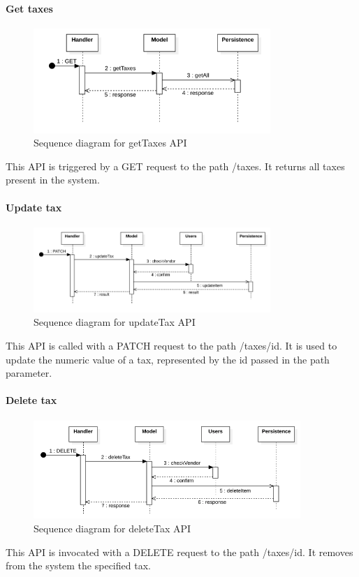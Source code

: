 \paragraph*{Get taxes}
\begin{figure}[H]
    \includegraphics[width=0.8\textwidth]{res/images/sequence-diagrams/taxes/getTaxes.png}
    \caption{Sequence diagram for getTaxes API}
\end{figure}
This API is triggered by a GET request to the path /taxes. It returns all taxes present in the system.

\paragraph*{Update tax}
\begin{figure}[H]
    \includegraphics[width=0.8\textwidth]{res/images/sequence-diagrams/taxes/updateTax.png}
    \caption{Sequence diagram for updateTax API}
\end{figure}
This API is called with a PATCH request to the path /taxes/{id}. It is used to update the numeric value of a tax, represented by the id passed in the path parameter.

\paragraph*{Delete tax}
\begin{figure}[H]
    \includegraphics[width=0.9\textwidth]{res/images/sequence-diagrams/taxes/deleteTax.png}
    \caption{Sequence diagram for deleteTax API}
\end{figure}
This API is invocated with a DELETE request to the path /taxes/{id}. It removes from the system the specified tax.

